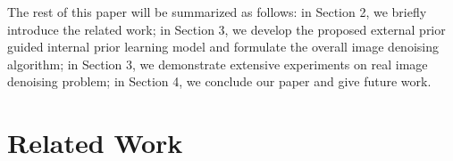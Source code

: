 \documentclass[10pt,twocolumn,letterpaper]{article}
\begin{document}
The rest of this paper will be summarized as follows: in Section 2, we briefly introduce the related work; in Section 3, we develop the proposed external prior guided internal prior learning model and formulate the overall image denoising algorithm; in Section 3, we demonstrate extensive experiments on real image denoising problem; in Section 4, we conclude our paper and give future work.

\section{Related Work}

\begin{figure}
\centering
{}
\end{figure}
\end{document}
